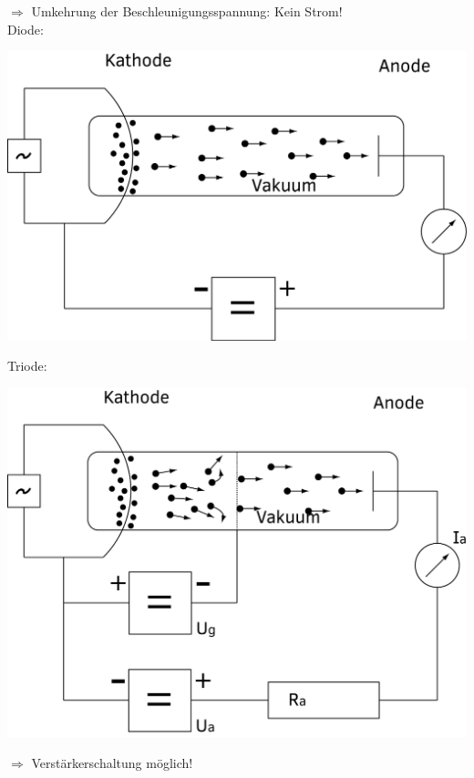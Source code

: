 \documentclass[11pt]{article}
\begin{document}
	$ \Rightarrow $ Umkehrung der Beschleunigungsspannung: Kein Strom! \\
	\newpage
	\noindent Diode:\\
	\begin{center}
		\includegraphics[width=0.7\linewidth]{skizzen/15/VL07/1}
	\end{center}
	 Triode: \\
	\begin{center}
		\includegraphics[width=0.7\linewidth]{skizzen/15/VL07/2}
	\end{center}
	\indent $ \Rightarrow $ Verstärkerschaltung möglich!\\
\end{document}
